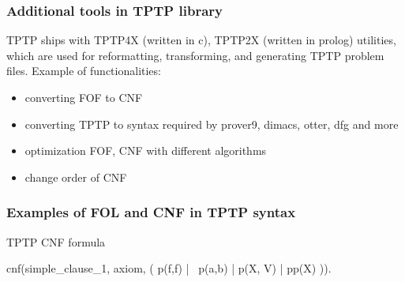
\subsubsection{Additional tools in TPTP library}

TPTP ships with \gls{TPTP4X} (written in c), \gls{TPTP2X} (written in prolog) utilities, which are used for reformatting, transforming, and generating TPTP problem files. Example of functionalities:

\begin{itemize}
  \item converting \gls{FOF} to \gls{CNF}
  \item converting TPTP to syntax required by prover9, dimacs, otter, dfg and more
  \item optimization \gls{FOF}, \gls{CNF} with different algorithms
  \item change order of \gls{CNF}
\end{itemize}

\subsubsection{Examples of FOL and CNF in TPTP syntax}

\begin{listing}[ht]
  \caption{TPTP CNF formula}
\begin{tptpcode}
cnf(simple_clause_1, axiom,
    ( p(f,f) | ~p(a,b) | p(X, V) | pp(X) )).

\end{tptpcode}
\end{listing}

